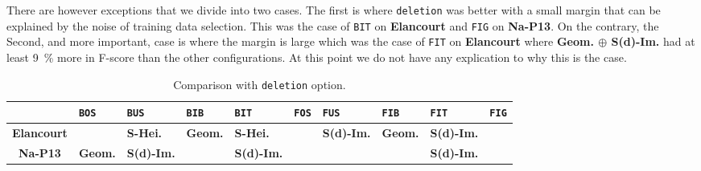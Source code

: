             There are however exceptions that we divide into two cases.
            The first is where \texttt{deletion} was better with a small margin that can be explained by the noise of training data selection.
            This was the case of \texttt{BIT} on \textbf{Elancourt} and \texttt{FIG} on \textbf{Na-P13}.
            On the contrary, the Second, and more important, case is where the margin is large which was the case of \texttt{FIT} on \textbf{Elancourt} where \textbf{Geom. \(\oplus\) S(d)-Im.} had at least \SI{9}{\percent} more in F-score than the other configurations.
            At this point we do not have any explication to why this is the case.\\

            \begin{table}[htbp]
                \footnotesize 
                \centering
                \renewcommand{\arraystretch}{2}
                \begin{subtable}{\textwidth}
                    \begin{tabular}{| c | x{1.1cm} x{1.1cm} x{1.1cm} x{1.1cm} |x{1.1cm} x{1.1cm} x{1.1cm} x{1.1cm} x{1.1cm} |}
                        \hline
                        & \texttt{BOS} & \texttt{BUS} & \texttt{BIB} & \texttt{BIT} & \texttt{FOS} & \texttt{FUS} & \texttt{FIB} & \texttt{FIT} & \texttt{FIG}\\
                        \hline
                        \textbf{Elancourt} &  &  \textbf{S-Hei.} &  \textbf{Geom.} &  \textbf{S-Hei.} &  &  \textbf{S(d)-Im.} &  \textbf{Geom.} &  \textbf{S(d)-Im.} &  \\
                        \textbf{Na-P13} &  \textbf{Geom.} &  \textbf{S(d)-Im.} &  &  \textbf{S(d)-Im.} &  &  &  &  \textbf{S(d)-Im.} &  \\
                        \hline
                    \end{tabular}
                    \caption{
                        \label{subtab::rf_scat_bl_comparison_del}
                        Comparison with \texttt{deletion} option.
                    }
                \end{subtable}
                \begin{subtable}{\textwidth}

\end{subtable}
\end{table}
